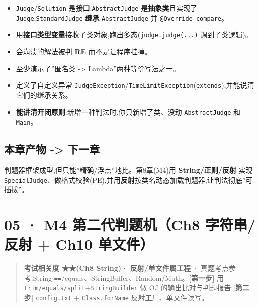 \documentclass[
  11pt,
]{ctexart}
\providecommand{\tightlist}{%
  \setlength{\itemsep}{0pt}\setlength{\parskip}{0pt}}
\begin{document}
\begin{itemize}
\tightlist
\item[$\square$]
  \texttt{Judge}/\texttt{Solution}
  是\textbf{接口};\texttt{AbstractJudge} 是\textbf{抽象类}且实现了
  \texttt{Judge};\texttt{StandardJudge} \textbf{继承}
  \texttt{AbstractJudge} 并 \texttt{@Override\ compare}。
\item[$\square$]
  用\textbf{接口类型变量}接收子类对象,跑出多态(\texttt{judge.judge(...)}
  调到子类逻辑)。
\item[$\square$]
  会崩溃的解法被判 \textbf{RE} 而不是让程序挂掉。
\item[$\square$]
  至少演示了''匿名类 -\textgreater{} Lambda''两种等价写法之一。
\item[$\square$]
  定义了自定义异常
  \texttt{JudgeException}/\texttt{TimeLimitException}(\texttt{extends}),并能说清它们的继承关系。
\item[$\square$]
  \textbf{能讲清开闭原则}:新增一种判法时,你只新增了类、没动
  \texttt{AbstractJudge} 和 \texttt{Main}。
\end{itemize}

\hypertarget{ux672cux7ae0ux4ea7ux7269---ux4e0bux4e00ux7ae0-2}{%
\subsection{本章产物 -\textgreater{}
下一章}\label{ux672cux7ae0ux4ea7ux7269---ux4e0bux4e00ux7ae0-2}}

判题器框架成型,但只能''精确/浮点''地比。第8章(M4)用
\textbf{String/正则/反射} 实现
\texttt{SpecialJudge}、做格式校验(PE),并用\textbf{反射}按类名动态加载判题器,让判法彻底''可插拔''。

\hypertarget{m4-ux7b2cux4e8cux4ee3ux5224ux9898ux673ach8-ux5b57ux7b26ux4e32ux53cdux5c04-ch10-ux5355ux6587ux4ef6}{%
\section{05 · M4 第二代判题机（Ch8 字符串/反射 + Ch10
单文件）}\label{m4-ux7b2cux4e8cux4ee3ux5224ux9898ux673ach8-ux5b57ux7b26ux4e32ux53cdux5c04-ch10-ux5355ux6587ux4ef6}}

\begin{quote}
\textbf{考试相关度 ★★(Ch8 String)· 反射/单文件属工程} ·
真题考点参考:String
\texttt{==}/equals、StringBuffer、Random/Math。\textbf{{[}第一步{]}}
\KS 用 \texttt{trim/equals/split}+\texttt{StringBuilder} 做 OJ
的输出比对与判题报告;\textbf{{[}第二步{]}} \GC \texttt{config.txt} +
\texttt{Class.forName} 反射工厂、单文件读写。
\end{quote}
\end{document}
